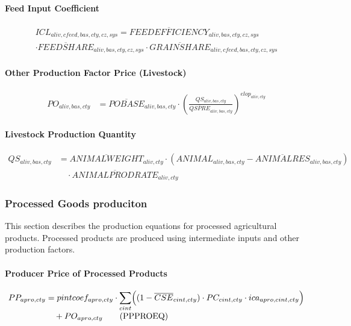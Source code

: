 \paragraph{Feed Input Coefficient}
\begin{multline}
  ICL_{aliv,cfeed,bas,cty,cz,sys} = \overline{FEEDEFFICIENCY}_{aliv,bas,cty,cz,sys}\\
     \cdot
     \overline{FEEDSHARE}_{aliv,bas,cty,cz,sys}
     \cdot
     \overline{GRAINSHARE}_{aliv,cfeed,bas,cty,cz,sys}
  \tag{ICLEQ}\label{eq:ICLEQ}
\end{multline}

\paragraph{Other Production Factor Price (Livestock)}
\begin{align}
  PO_{aliv,bas,cty}
  &= \overline{POBASE}_{aliv,bas,cty}
     \cdot
     \left(
       \frac{
         QS_{aliv,bas,cty}
       }{
         \overline{QSPRE}_{aliv,bas,cty}
       }
     \right)^{elop_{aliv,cty}}
  \tag{POLIVEQ}\label{eq:POLIVEQ}
\end{align}

\paragraph{Livestock Production Quantity}
\begin{align}
  QS_{aliv,bas,cty}
  &= \overline{ANIMALWEIGHT}_{aliv,cty}
     \cdot
     (
       ANIMAL_{aliv,bas,cty}
       - \overline{ANIMALRES}_{aliv,bas,cty}
     )
     \nonumber\\[-0.3em]
  &\quad
     \cdot
     \overline{ANIMALPRODRATE}_{aliv,cty}
  \tag{ANIMALEQ}\label{eq:ANIMALEQ}
\end{align}

\subsubsection{Processed Goods produciton}

This section describes the production equations for processed agricultural products.  
Processed products are produced using intermediate inputs and other production factors.

\paragraph{Producer Price of Processed Products}
\begin{align}
  PP_{apro,cty}
  &= pintcoef_{apro,cty}
     \cdot
     \sum_{cint}
     \Bigl(
       (1 - \overline{CSE}_{cint,cty})
       \cdot
       PC_{cint,cty}
       \cdot
       ica_{apro,cint,cty}
     \Bigr)
     \nonumber\\[-0.3em]
  &\quad
     + PO_{apro,cty}
  \tag{PPPROEQ}\label{eq:PPPROEQ}
\end{align}

